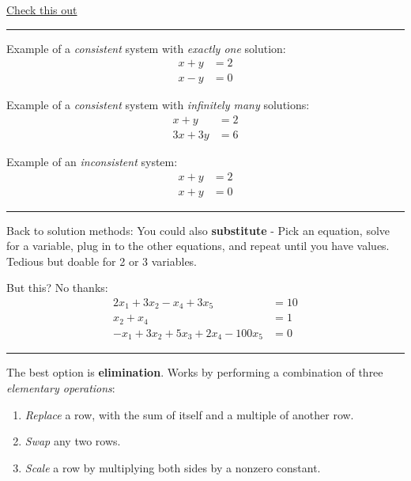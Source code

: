 \documentclass[
  letterpaper,
  DIV=11,
  numbers=noendperiod]{scrartcl}
\providecommand{\tightlist}{%
  \setlength{\itemsep}{0pt}\setlength{\parskip}{0pt}}\usepackage{longtable,booktabs,array}
\begin{document}
\href{https://www.desmos.com/calculator/wrajgsvua6}{Check this out}

\begin{center}\rule{0.5\linewidth}{0.5pt}\end{center}

Example of a \emph{consistent} system with \emph{exactly one} solution:
\[\begin{align*}
x + y &= 2 \\
x - y &= 0
\end{align*}\]

Example of a \emph{consistent} system with \emph{infinitely many}
solutions: \[\begin{align*}
x + y &= 2 \\
3x + 3y &= 6
\end{align*}\]

Example of an \emph{inconsistent} system: \[\begin{align*}
x + y &= 2 \\
x + y &= 0
\end{align*}\]

\begin{center}\rule{0.5\linewidth}{0.5pt}\end{center}

Back to solution methods: You could also \textbf{substitute} - Pick an
equation, solve for a variable, plug in to the other equations, and
repeat until you have values. Tedious but doable for 2 or 3 variables.

But this? No thanks: \[\begin{align*}
2x_1 + 3x_2 - x_4 + 3x_5 &= 10 \\
x_2 + x_4 &= 1 \\
-x_1 + 3x_2 + 5x_3 + 2x_4 - 100x_5 &= 0 
\end{align*}\]

\begin{center}\rule{0.5\linewidth}{0.5pt}\end{center}

The best option is \textbf{elimination}. Works by performing a
combination of three \emph{elementary operations}:

\begin{enumerate}
\def\labelenumi{\arabic{enumi}.}
\tightlist
\item
  \emph{Replace} a row, with the sum of itself and a multiple of another
  row.
\item
  \emph{Swap} any two rows.
\item
  \emph{Scale} a row by multiplying both sides by a nonzero constant.
\end{enumerate}
\end{document}
